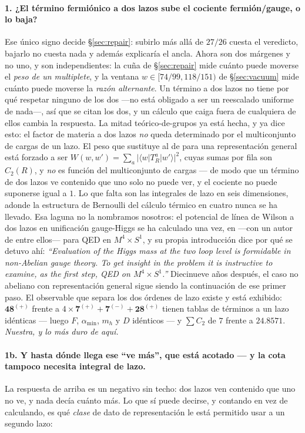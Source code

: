 \documentclass[11pt,a4paper]{article}
\newcommand{\rep}[1]{\mathbf{#1}}
\newcommand{\amin}{\alpha_{\min}}
\begin{document}
\paragraph{1. ¿El término fermiónico a dos lazos sube el cociente fermión/gauge, o lo baja?} Ese
único signo decide \S\ref{sec:repair}: subirlo más allá de $27/26$ cuesta el veredicto, bajarlo no
cuesta nada y además explicaría el ancla. Ahora son dos márgenes y no uno, y son independientes: la
cuña de \S\ref{sec:repair} mide cuánto puede moverse el \emph{peso de un multiplete}, y la ventana
$w\in[74/99,118/151)$ de \S\ref{sec:vacuum} mide cuánto puede moverse la \emph{razón alternante}. Un
término a dos lazos no tiene por qué respetar ninguno de los dos ---no está obligado a ser un
reescalado uniforme de nada---, así que se citan los dos, y un cálculo que caiga fuera de cualquiera
de ellos cambia la respuesta. La mitad teórico-de-grupos ya está hecha, y ya dice esto: el factor de
materia a dos lazos \emph{no} queda determinado por el multiconjunto de cargas de un lazo.
El peso que sustituye al de \cite{GuoDu} para una representación general está forzado a ser
$W(w,w')=\sum_a|\langle w|T^a_R|w'\rangle|^2$, cuyas sumas por fila son $C_2(R)$, y \emph{no} es
función del multiconjunto de cargas --- de modo que un término de dos lazos ve contenido que uno solo
no puede ver, y el cociente no puede suponerse igual a $1$. Lo que falta son las integrales de lazo
en seis dimensiones, adonde la estructura de Bernoulli del cálculo térmico en cuatro nunca se ha
llevado. Esa laguna no la nombramos nosotros: el potencial de línea de Wilson a dos lazos en
unificación gauge-Higgs se ha calculado una vez, en \cite{HMTY} ---con un autor de
\cite{AdachiMaru} entre ellos--- para QED en $M^4\times S^1$, y su propia introducción dice por qué
se detuvo ahí: \emph{``Evaluation of the Higgs mass at the two loop level is formidable in
non-Abelian gauge theory. To get insight in the problem it is instructive to examine, as the first
step, QED on $M^4\times S^1$.''} Diecinueve años después, el caso no abeliano con representación
general sigue siendo la continuación de ese primer paso.
El observable que separa los dos órdenes de lazo existe y está exhibido: $\rep{48}^{(+)}$
frente a $4\times\rep7^{(+)}+\rep7^{(-)}+\rep{28}^{(+)}$ tienen tablas de términos a un lazo
idénticas --- luego $F$, $\amin$, $m_h$ y $D$ idénticos --- y $\sum C_2$ de $7$ frente a $24.8571$.
\emph{Nuestra, y lo más duro de aquí.}

\paragraph{1b. Y hasta dónde llega ese ``ve más'', que está acotado --- y la cota tampoco necesita
integral de lazo.} La respuesta de arriba es un negativo sin techo: dos lazos ven contenido que uno
no ve, y nada decía cuánto más. Lo que sí puede decirse, y contando en vez de calculando, es qué
\emph{clase} de dato de representación le está permitido usar a un segundo lazo:
\end{document}
